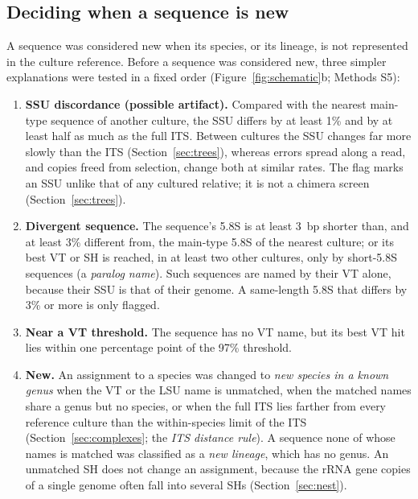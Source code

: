 \documentclass[11pt]{article}
\begin{document}
\subsection{Deciding when a sequence is new}\label{sec:novelty}
A sequence was considered new when its species, or its lineage, is not represented in the culture reference. Before
a sequence was considered new, three simpler explanations were tested in a fixed order (Figure~\ref{fig:schematic}b;
Methods S5):
\begin{enumerate}
\item \textbf{SSU discordance (possible artifact).} Compared with the nearest main-type sequence of another culture,
the SSU differs by at least 1\% and by at least half as much as the full ITS. Between cultures the SSU changes far
more slowly than the ITS (Section~\ref{sec:trees}), whereas errors spread along a read, and copies freed from
selection, change both at similar rates. The flag marks an SSU unlike that of any cultured relative; it is not a
chimera screen (Section~\ref{sec:trees}).
\item \textbf{Divergent sequence.} The sequence's 5.8S is at least 3~bp shorter than, and at least 3\% different
from, the main-type 5.8S of the nearest culture; or its best VT or SH is reached, in at least two other cultures,
only by short-5.8S sequences (a \emph{paralog name}). Such sequences are named by their VT alone, because their SSU
is that of their genome. A same-length 5.8S that differs by 3\% or more is only flagged.
\item \textbf{Near a VT threshold.} The sequence has no VT name, but its best VT hit lies within one percentage
point of the 97\% threshold.
\item \textbf{New.} An assignment to a species was changed to \emph{new species in a known genus} when the VT or the
LSU name is unmatched, when the matched names share a genus but no species, or when the full ITS lies farther from
every reference culture than the within-species limit of the ITS (Section~\ref{sec:complexes}; the \emph{ITS
distance rule}). A sequence none of whose names is matched was classified as a \emph{new lineage}, which has no
genus. An unmatched SH does not change an assignment, because the rRNA gene copies of a single genome often fall
into several SHs (Section~\ref{sec:nest}).
\end{enumerate}
\end{document}
